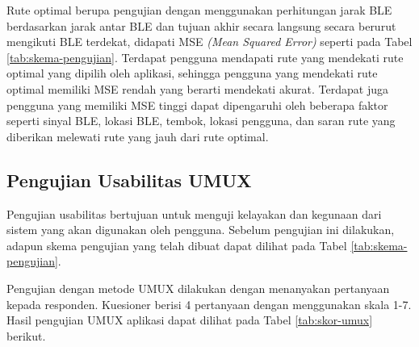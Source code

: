 \begin{table}[H]
\caption{Skema Pengujian Akurasi Pengambilan Rute di Gedung A FMIPA Optimal dalam MSE \textit{(Mean Squared Error)}}
\label{tab:skema-pengujian}
\end{table}

\par Rute optimal berupa pengujian dengan menggunakan perhitungan jarak BLE berdasarkan jarak antar BLE dan tujuan akhir secara langsung secara berurut mengikuti BLE terdekat, didapati MSE \textit{(Mean Squared Error)} seperti pada Tabel \ref{tab:skema-pengujian}. Terdapat pengguna mendapati rute yang mendekati rute optimal yang dipilih oleh aplikasi, sehingga pengguna yang mendekati rute optimal memiliki MSE rendah yang berarti mendekati akurat. Terdapat juga pengguna yang memiliki MSE tinggi dapat dipengaruhi oleh beberapa faktor seperti sinyal BLE, lokasi BLE, tembok, lokasi pengguna, dan saran rute yang diberikan melewati rute yang jauh dari rute optimal.


\subsection{Pengujian Usabilitas UMUX}
\par Pengujian usabilitas bertujuan untuk menguji kelayakan dan kegunaan dari sistem yang akan digunakan oleh pengguna. Sebelum pengujian ini dilakukan, adapun skema pengujian yang telah dibuat dapat dilihat pada Tabel \ref{tab:skema-pengujian}.

\par Pengujian dengan metode UMUX dilakukan dengan menanyakan pertanyaan kepada responden. Kuesioner berisi 4 pertanyaan dengan menggunakan skala 1-7. Hasil pengujian UMUX aplikasi dapat dilihat pada Tabel \ref{tab:skor-umux} berikut.

